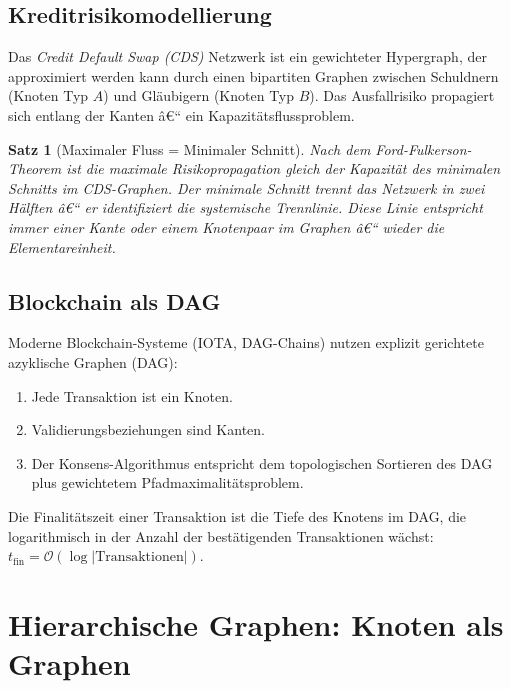 ﻿\documentclass[12pt,a4paper,twoside]{article}
\theoremstyle{definition}
\theoremstyle{plain}
\newtheorem{theorem}{Satz}[section]
\theoremstyle{remark}
\begin{document}
\subsection{Kreditrisikomodellierung}

Das \emph{Credit Default Swap (CDS)} Netzwerk ist ein
gewichteter Hypergraph, der approximiert werden kann durch
einen bipartiten Graphen zwischen Schuldnern (Knoten
Typ $A$) und Gläubigern (Knoten Typ $B$).  Das Ausfallrisiko
propagiert sich entlang der Kanten â€“ ein Kapazitätsflussproblem.

\begin{theorem}[Maximaler Fluss = Minimaler Schnitt]
Nach dem Ford-Fulkerson-Theorem ist die maximale
Risikopropagation gleich der Kapazität des minimalen
Schnitts im CDS-Graphen.  Der minimale Schnitt trennt
das Netzwerk in zwei Hälften â€“ er identifiziert die
\emph{systemische Trennlinie}.  Diese Linie entspricht
immer einer Kante oder einem Knotenpaar im Graphen â€“
wieder die Elementareinheit.
\end{theorem}

\subsection{Blockchain als DAG}

Moderne Blockchain-Systeme (IOTA, DAG-Chains) nutzen explizit
gerichtete azyklische Graphen (DAG):
\begin{enumerate}
  \item Jede Transaktion ist ein Knoten.
  \item Validierungsbeziehungen sind Kanten.
  \item Der Konsens-Algorithmus entspricht dem
        topologischen Sortieren des DAG plus gewichtetem
        Pfadmaximalitätsproblem.
\end{enumerate}
Die Finalitätszeit einer Transaktion ist die Tiefe des
Knotens im DAG, die logarithmisch in der Anzahl der
bestätigenden Transaktionen wächst: $t_{\text{fin}} =
\mathcal{O}(\log |\text{Transaktionen}|)$.

\section{Hierarchische Graphen: Knoten als Graphen}
\label{sec:hierarchie}

\end{document}
